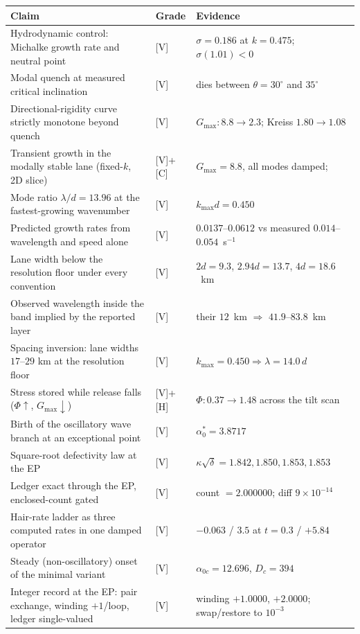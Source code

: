 \documentclass[11pt]{article}
\theoremstyle{definition}
\theoremstyle{remark}
\begin{document}
\begin{center}
\small
\begin{tabular}{p{8.4cm} l p{4.1cm}}
\hline
Claim & Grade & Evidence \\ \hline
Hydrodynamic control: Michalke growth rate and neutral point & [V] & $\sigma=0.186$ at $k=0.475$; $\sigma(1.01)<0$ \\
Modal quench at measured critical inclination & [V] & dies between $\theta=30^\circ$ and $35^\circ$ \\
Directional-rigidity curve strictly monotone beyond quench & [V] & $G_{\max}: 8.8\to2.3$; Kreiss $1.80\to1.08$ \\
Transient growth in the modally stable lane (fixed-$k$, 2D slice) & [V]+[C] & $G_{\max}=8.8$, all modes damped; \cite{fraser} \\
Mode ratio $\lambda/d=13.96$ at the fastest-growing wavenumber & [V] & $k_{\max}d=0.450$ \\
Predicted growth rates from wavelength and speed alone & [V] & $0.0137$--$0.0612$ vs measured $0.014$--$0.054$~s$^{-1}$ \\
Lane width below the resolution floor under every convention & [V] & $2d=9.3$, $2.94d=13.7$, $4d=18.6$~km \\
Observed wavelength inside the band implied by the reported layer & [V] & their $12$~km $\Rightarrow$ $41.9$--$83.8$~km \\
Spacing inversion: lane widths $17$--$29$ km at the resolution floor & [V] & $k_{\max}=0.450 \Rightarrow \lambda=14.0\,d$ \\
Stress stored while release falls ($\Phi\uparrow$, $G_{\max}\downarrow$) & [V]+[H] & $\Phi: 0.37\to1.48$ across the tilt scan \\
Birth of the oscillatory wave branch at an exceptional point & [V] & $\alpha_0^*=3.8717$ \\
Square-root defectivity law at the EP & [V] & $\kappa\sqrt{\delta}=1.842,1.850,1.853,1.853$ \\
Ledger exact through the EP, enclosed-count gated & [V] & count $=2.000000$; diff $9\times10^{-14}$ \\
Hair-rate ladder as three computed rates in one damped operator & [V] & $-0.063$ / $3.5$ at $t{=}0.3$ / $+5.84$ \\
Steady (non-oscillatory) onset of the minimal variant & [V] & $\alpha_{0c}=12.696$, $D_c=394$ \\
Integer record at the EP: pair exchange, winding $+1$/loop, ledger single-valued & [V] & winding $+1.0000$, $+2.0000$; swap/restore to $10^{-3}$ \\

\end{tabular}
\end{center}
\end{document}
